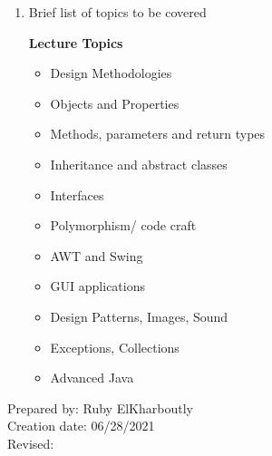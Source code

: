 \begin{enumerate}[1.]
\item Brief list of topics to be covered\\
  {\bfseries
    Lecture Topics
    \begin{itemize}
      \item Design Methodologies
      \item Objects and Properties
	  \item Methods, parameters and return types
	  \item Inheritance and abstract classes
	  \item Interfaces
	  \item Polymorphism/ code craft
	  \item AWT and Swing
	  \item GUI applications
	  \item Design Patterns, Images, Sound
	  \item  Exceptions, Collections
	  \item Advanced Java
    \end{itemize}
  }

\end{enumerate}

\noindent Prepared by: Ruby ElKharboutly\\
\noindent Creation date: 06/28/2021\\
\noindent Revised:\\
